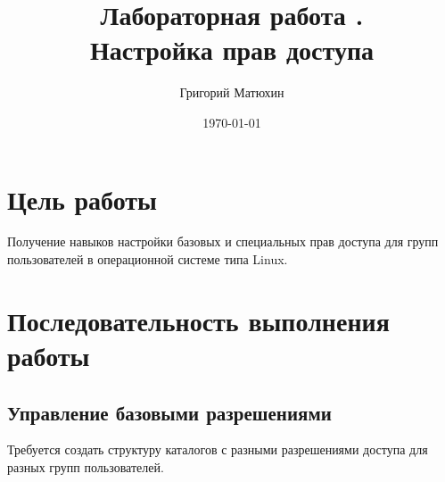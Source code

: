 \documentclass[12pt]{article}
\author{Григорий Матюхин}
\date{\today}
\title{Лабораторная работа \textnumero3.\\Настройка прав доступа}
\begin{document}
\maketitle
\newpage
\tableofcontents
\newpage
\section{Цель работы}
Получение навыков настройки базовых и специальных прав доступа для групп пользователей в операционной системе типа Linux.

\section{Последовательность выполнения работы}

\subsection{Управление базовыми разрешениями}
Требуется создать структуру каталогов с разными разрешениями доступа для
разных групп пользователей.
\end{document}
